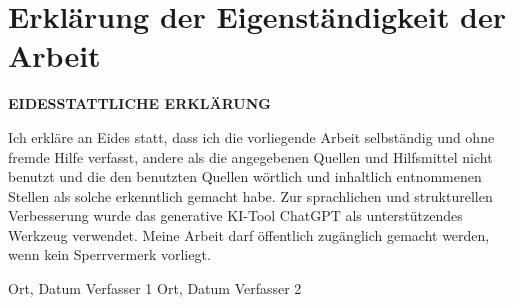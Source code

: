 \chapter*{Erklärung der Eigenständigkeit der Arbeit}
\label{cha:affirmation}


\textbf{EIDESSTATTLICHE ERKLÄRUNG }
\vspace{1cm}

Ich erkläre an Eides statt, dass ich die vorliegende Arbeit selbständig und ohne fremde Hilfe verfasst, andere als die angegebenen Quellen und Hilfsmittel nicht benutzt und die den benutzten Quellen wörtlich und inhaltlich entnommenen Stellen als solche erkenntlich gemacht habe. Zur sprachlichen und strukturellen Verbesserung wurde das generative KI-Tool ChatGPT als unterstützendes Werkzeug verwendet. Meine Arbeit darf öffentlich zugänglich gemacht werden, wenn kein Sperrvermerk vorliegt.

\vfill\vfill



Ort, Datum  \hspace{5cm}Verfasser  1     
\vfill    
Ort, Datum  \hspace{5cm}Verfasser  2          